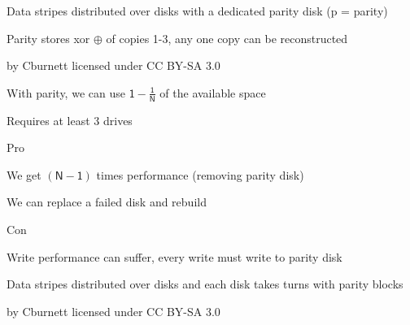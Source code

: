 \begin{slide}
  

  Data stripes distributed over disks with a dedicated parity disk (p = parity)

  \leftspace{}Parity stores xor $\oplus$ of copies 1-3, any one copy can be
               reconstructed

  \begin{center}
    
  \end{center}

  \begin{flushright}
    by Cburnett licensed under CC BY-SA 3.0
  \end{flushright}

\end{slide}

\begin{slide}
  

  With parity, we can use $\mathsf{1 - \frac{1}{N}}$ of the available space

  \leftspace{}Requires at least 3 drives
  \medskip

  Pro

  \leftspace{}We get $\mathsf{(N - 1)}$ times performance
               (removing parity disk)

  \leftspace{}We can replace a failed disk and rebuild
  \medskip

  Con

  \leftspace{}Write performance can suffer, every write must write to parity
               disk

\end{slide}

\begin{slide}
  

  Data stripes distributed over disks and each disk takes turns with parity
  blocks

  \begin{center}
    
  \end{center}

  \begin{flushright}
    by Cburnett licensed under CC BY-SA 3.0
  \end{flushright}

\end{slide}

